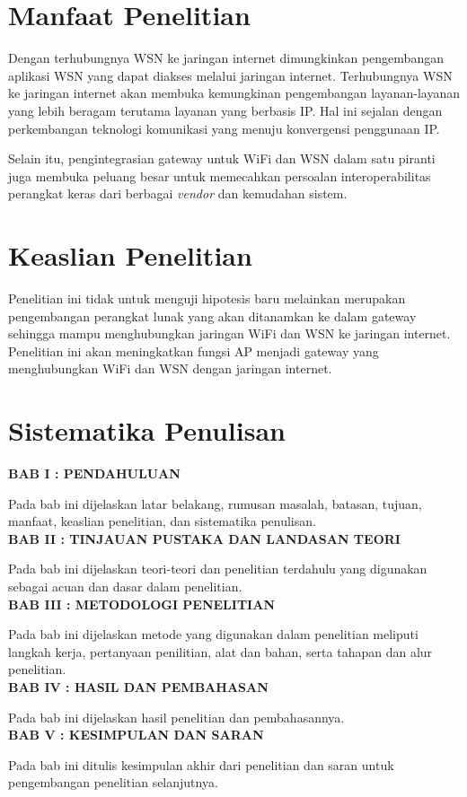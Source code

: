 \section{Manfaat Penelitian}
Dengan terhubungnya WSN ke jaringan internet dimungkinkan pengembangan aplikasi WSN yang dapat diakses melalui jaringan internet. Terhubungnya WSN ke jaringan internet akan membuka kemungkinan pengembangan layanan-layanan yang lebih beragam terutama layanan yang berbasis IP. Hal ini sejalan dengan perkembangan teknologi komunikasi yang menuju konvergensi penggunaan IP.

Selain itu, pengintegrasian gateway untuk WiFi dan WSN dalam satu piranti juga membuka peluang besar untuk memecahkan persoalan interoperabilitas perangkat keras dari berbagai \emph{vendor} dan kemudahan sistem.


\section{Keaslian Penelitian}
Penelitian ini tidak untuk menguji hipotesis baru melainkan merupakan pengembangan perangkat lunak yang akan ditanamkan ke dalam gateway sehingga mampu menghubungkan jaringan WiFi dan WSN ke jaringan internet. Penelitian ini akan meningkatkan fungsi AP menjadi gateway yang menghubungkan WiFi dan WSN dengan jaringan internet.


\section{Sistematika Penulisan}
\noindent
\textbf{BAB I : PENDAHULUAN}

Pada bab ini dijelaskan latar belakang, rumusan masalah, batasan, tujuan, manfaat, keaslian penelitian, dan sistematika penulisan.\\

\noindent
\textbf{BAB II : TINJAUAN PUSTAKA DAN LANDASAN TEORI}

Pada bab ini dijelaskan teori-teori dan penelitian terdahulu yang digunakan sebagai acuan dan dasar dalam penelitian.\\

\noindent
\textbf{BAB III : METODOLOGI PENELITIAN}

Pada bab ini dijelaskan metode yang digunakan dalam penelitian meliputi langkah kerja, pertanyaan penilitian, alat dan bahan, serta tahapan dan alur penelitian.\\

\noindent
\textbf{BAB IV : HASIL DAN PEMBAHASAN}

Pada bab ini dijelaskan hasil penelitian dan pembahasannya.\\

\noindent
\textbf{BAB V : KESIMPULAN DAN SARAN}

Pada bab ini ditulis kesimpulan akhir dari penelitian dan saran untuk pengembangan penelitian selanjutnya.\\

\begin{comment}

\end{comment}
